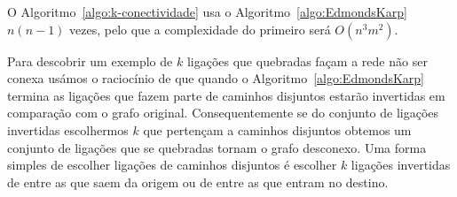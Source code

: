 \documentclass[10pt,a4paper]{article}
\begin{document}
O Algoritmo~\ref{algo:k-conectividade} usa o Algoritmo~\ref{algo:EdmondsKarp} $n(n-1)$ vezes, pelo que a complexidade do primeiro será $O(n^3 m^2)$.

Para descobrir um exemplo de $k$ ligações que quebradas façam a rede não ser conexa usámos o raciocínio de que quando o Algoritmo~\ref{algo:EdmondsKarp} termina as ligações que fazem parte de caminhos disjuntos estarão invertidas em comparação com o grafo original. Consequentemente se do conjunto de ligações invertidas escolhermos $k$ que pertençam a caminhos disjuntos obtemos um conjunto de ligações que se quebradas tornam o grafo desconexo. Uma forma simples de escolher ligações de caminhos disjuntos é escolher $k$ ligações invertidas de entre as que saem da origem ou de entre as que entram no destino.



\nocite{slidesADRC}
\end{document}
